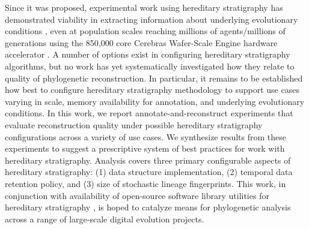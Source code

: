 Since it was proposed, experimental work using hereditary stratigraphy has demonstrated viability in extracting information about underlying evolutionary conditions \citep{moreno2024ecology}, even at population scales reaching millions of agents/millions of generations using the 850,000 core Cerebras Wafer-Scale Engine hardware accelerator \citep{moreno2024trackable}.
A number of options exist in configuring hereditary stratigraphy algorithms, but no work has yet systematically investigated how they relate to quality of phylogenetic reconstruction.
In particular, it remains to be established how best to configure hereditary stratigraphy methodology to support use cases varying in scale, memory availability for annotation, and underlying evolutionary conditions.
In this work, we report annotate-and-reconstruct experiments that evaluate reconstruction quality under possible hereditary stratigraphy configurations across a variety of use cases.
We synthesize results from these experiments to suggest a prescriptive system of best practices for work with hereditary stratigraphy.
Analysis covers three primary configurable aspects of hereditary stratigraphy: (1) data structure implementation, (2) temporal data retention policy, and (3) size of stochastic lineage fingerprints.
This work, in conjunction with availability of open-source software library utilities for hereditary stratigraphy \citep{moreno2022hstrat}, is hoped to catalyze means for phylogenetic analysis across a range of large-scale digital evolution projects.
